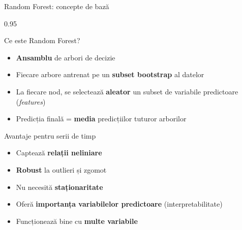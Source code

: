 \documentclass[9pt, aspectratio=169, t]{beamer}
\begin{document}
\begin{frame}{Random Forest: concepte de bază}
    \begin{cminipage}{0.95\textwidth}
        \begin{block}{Ce este Random Forest?}
            \begin{itemize}\setlength{\itemsep}{0pt}
                \item \textbf{Ansamblu} de arbori de decizie
                \item Fiecare arbore antrenat pe un \textbf{subset bootstrap} al datelor
                \item La fiecare nod, se selectează \textbf{aleator} un subset de variabile predictoare (\emph{features})
                \item Predicția finală = \textbf{media} predicțiilor tuturor arborilor
            \end{itemize}
        \end{block}

        \vspace{0.2cm}

        \begin{exampleblock}{Avantaje pentru serii de timp}
            \begin{itemize}\setlength{\itemsep}{0pt}
                \item Captează \textbf{relații neliniare}
                \item \textbf{Robust} la outlieri și zgomot
                \item Nu necesită \textbf{staționaritate}
                \item Oferă \textbf{importanța variabilelor predictoare} (interpretabilitate)
                \item Funcționează bine cu \textbf{multe variabile}
            \end{itemize}
        \end{exampleblock}
    \end{cminipage}
\end{frame}
\end{document}
